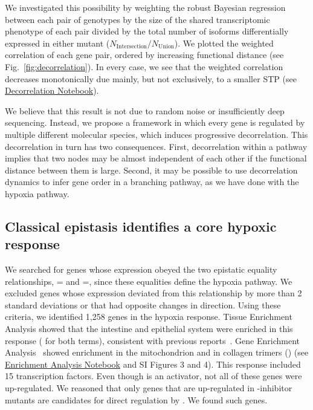 We investigated this possibility by weighting the robust Bayesian regression
between each pair of genotypes by the size of the shared transcriptomic
phenotype of each pair divided by the total number of isoforms differentially
expressed in either mutant ($N_\mathrm{Intersection}/N_{\mathrm{Union}}$). We
plotted the weighted correlation of each gene pair, ordered by increasing
functional distance (see Fig.~\ref{fig:decorrelation}). In every case, we see
that the weighted correlation decreases monotonically due mainly, but not
exclusively, to a smaller STP (see
\href{https://wormlabcaltech.github.io/mprsq/analysis_notebooks/10_decorrelation.html}
{Decorrelation Notebook}).

We believe that this result is not due to random noise or insufficiently deep
sequencing. Instead, we propose a framework in which every gene is regulated by
multiple different molecular species, which induces progressive decorrelation.
This decorrelation in turn has two consequences. First, decorrelation within a
pathway implies that two nodes may be almost independent of each other if the
functional distance between them is large. Second, it may be possible to use
decorrelation dynamics to infer gene order in a branching pathway, as we have
done with the hypoxia pathway.

\subsection*{Classical epistasis identifies a core hypoxic response}
We searched for genes whose expression obeyed the two epistatic equality
relationships, \hif{}=\eglhif{} and \egl{}=\eglvhl{}, since these equalities
define the hypoxia pathway. We excluded genes whose expression deviated from
this relationship by more than 2 standard deviations or that had opposite
changes in direction. Using these criteria, we identified 1,258 genes in the
hypoxia response. Tissue Enrichment Analysis showed that the intestine and
epithelial system were enriched in this response ( for both terms),
consistent with previous reports~\citep{Budde2010}. Gene Enrichment
Analysis~\citep{Angeles-Albores106369} showed enrichment in the mitochondrion and
in collagen trimers () (see
\href{https://wormlabcaltech.github.io/mprsq/analysis_notebooks/3_ea_of_hypoxia_data.html}
{Enrichment Analysis Notebook} and SI Figures 3 and 4). This response included
15 transcription factors. Even though \hifp{} is
an activator, not all of these genes were up-regulated. We reasoned that only
genes that are up-regulated in \hifp{}-inhibitor mutants are candidates for
direct regulation by \hifp{}. We found \hiftargets{} such genes.

